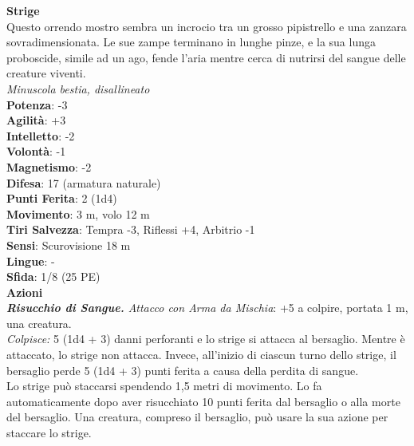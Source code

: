 \begin{multicols}{2}
\medskip\textbf{Strige}\\
Questo orrendo mostro sembra un incrocio tra un grosso pipistrello e una zanzara sovradimensionata. Le sue zampe terminano in lunghe pinze, e la sua lunga proboscide, simile ad un ago, fende l'aria mentre cerca di nutrirsi del sangue delle creature viventi.\\
\emph{Minuscola bestia, disallineato}\\
\textbf{Potenza}: -3\\
\textbf{Agilità}: +3\\
\textbf{Intelletto}: -2\\
\textbf{Volontà}: -1\\
\textbf{Magnetismo}: -2\\
\textbf{Difesa}: 17 (armatura naturale)\\
\textbf{Punti Ferita}: 2 (1d4)\\
\textbf{Movimento}: 3 m, volo 12 m\\
\textbf{Tiri Salvezza}: Tempra -3, Riflessi +4, Arbitrio -1\\
\textbf{Sensi}: Scurovisione 18 m\\
\textbf{Lingue}: -\\
\textbf{Sfida}: 1/8 (25 PE)\smallskip\\
\smallskip\textbf{Azioni}\\
\emph{\textbf{Risucchio di Sangue.} Attacco con Arma da Mischia}: +5 a colpire, portata 1 m, una creatura.\\
\emph{Colpisce:} 5 (1d4 + 3) danni perforanti e lo strige si attacca al bersaglio. Mentre è attaccato, lo strige non attacca. Invece, all'inizio di ciascun turno dello strige, il bersaglio perde 5 (1d4 + 3) punti ferita a causa della perdita di sangue.\\
Lo strige può staccarsi spendendo 1,5 metri di movimento. Lo fa automaticamente dopo aver risucchiato 10 punti ferita dal bersaglio o alla morte del bersaglio. Una creatura, compreso il bersaglio, può usare la sua azione per staccare lo strige.\\


\end{multicols}
